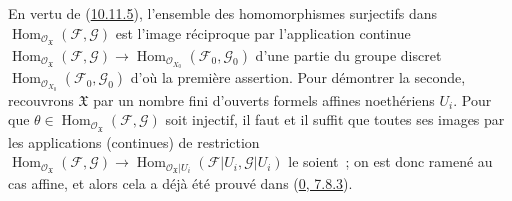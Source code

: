 En vertu de (\hyperref[I.10.11.5-fr]{10.11.5}), l'ensemble des
homomorphismes surjectifs dans
$\operatorname{Hom}_{\mathscr{O}_{\mathfrak{X}}}
(\mathscr{F},\mathscr{G})$ est l'image réciproque par l'application
continue
$\operatorname{Hom}_{\mathscr{O}_{\mathfrak{X}}}
(\mathscr{F},\mathscr{G})\to
\operatorname{Hom}_{\mathscr{O}_{X_0}}(\mathscr{F}_0,\mathscr{G}_0)$
d'une partie du groupe discret
$\operatorname{Hom}_{\mathscr{O}_{X_0}}(\mathscr{F}_0,\mathscr{G}_0)$
d'où la première assertion. Pour démontrer la seconde, recouvrons
$\mathfrak{X}$ par un nombre fini d'ouverts formels affines noethériens
$U_i$. Pour que
$\theta\in\operatorname{Hom}_{\mathscr{O}_{\mathfrak{X}}}
(\mathscr{F},\mathscr{G})$ soit injectif, il faut et il suffit que toutes
ses images par les applications (continues) de restriction
$\operatorname{Hom}_{\mathscr{O}_{\mathfrak{X}}}
(\mathscr{F},\mathscr{G})\to
\operatorname{Hom}_{\mathscr{O}_{\mathfrak{X}}|U_i}
(\mathscr{F}|U_i,\mathscr{G}|U_i)$ le soient~; on est donc ramené au cas
affine, et alors cela a déjà été prouvé dans
(\hyperref[0.7.8.3-fr]{0, 7.8.3}).

